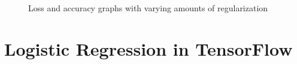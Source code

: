 \documentclass[12pt]{article}
\begin{document}
\begin{figure}[!tbp]
  \hfill
  \hfill
  \caption{Loss and accuracy graphs with varying amounts of regularization}
\end{figure}

\section{Logistic Regression in TensorFlow}
\end{document}
